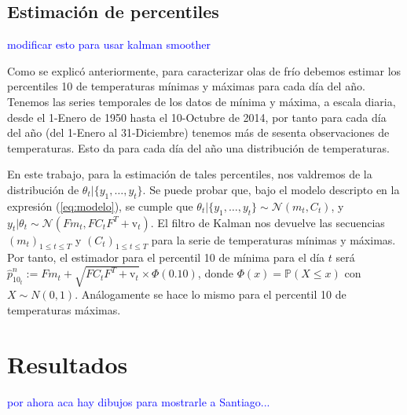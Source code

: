 \documentclass[12pt]{article}\usepackage[]{graphicx}\usepackage[]{color}
\newcommand{\p}{\mathbb{P}}
\begin{document}
\subsection{Estimación de percentiles}
\textcolor{blue}{modificar esto para usar kalman smoother}

Como se explicó anteriormente, para caracterizar olas de frío debemos estimar los percentiles 10 de temperaturas mínimas y máximas para cada día del año. Tenemos las series temporales de los datos de mínima y máxima, a escala diaria, desde el 1-Enero de 1950 hasta el 10-Octubre de 2014, por tanto para cada día del año (del 1-Enero al 31-Diciembre) tenemos más de sesenta observaciones de temperaturas. Esto da para cada día del año una distribución de temperaturas.  %

En este trabajo, para la estimación de tales percentiles, nos valdremos de la distribución de $\theta_t | \{y_1,\dots,y_t\}$. Se puede probar que, bajo el modelo descripto en la expresión (\ref{eq:modelo}), se cumple que $\theta_t | \{y_1,\dots,y_t\} \sim \mathcal{N}(m_t,C_t)$, y $y_t|\theta_t \sim \mathcal{N}(Fm_t,FC_tF^T + \text{v}_t)$. El filtro de Kalman nos devuelve las secuencias $(m_t)_{1\leq t \leq T}$ y $(C_t)_{1\leq t \leq T}$ para la serie de temperaturas mínimas y máximas. Por tanto, el estimador para el percentil 10 de mínima para el día $t$ será $\hat{p}^n_{10_t}:=Fm_t+\sqrt{FC_tF^T + \text{v}_t}\times \Phi(0.10)$, donde $\Phi(x)=\p(X\leq x)$ con $X\sim N(0,1)$. Análogamente se hace lo mismo para el percentil 10 de temperaturas máximas.

\section{Resultados}
\textcolor{blue}{por ahora aca hay dibujos para mostrarle a Santiago...}

\end{document}
